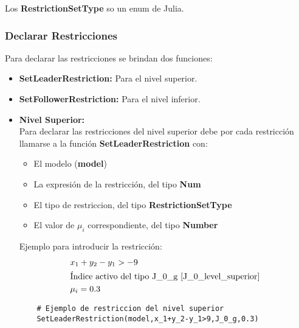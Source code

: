 Los \textbf{RestrictionSetType} so un enum de Julia.

\subsubsection{Declarar Restricciones}

Para declarar las restricciones se brindan dos funciones:
\begin{itemize}
    \item \textbf{SetLeaderRestriction:} Para el nivel superior.
    \item \textbf{SetFollowerRestriction:} Para el nivel inferior.
\end{itemize}
\begin{itemize}
    \item \textbf{Nivel Superior:}\\

Para declarar las restricciones del nivel superior debe por cada restricción
llamarse a la función \textbf{SetLeaderRestriction} con:
\begin{itemize}
    \item El modelo (\textbf{model})
    \item La expresión de la restricción, del tipo \textbf{Num}
    \item El tipo de restriccion, del tipo \textbf{RestrictionSetType}
    \item El valor de $\mu_i$ correspondiente, del tipo \textbf{Number} 
\end{itemize}

Ejemplo para introducir la restricción:
\begin{align*}
    &x_1+y_2-y_1 > -9 \\
    &\text{Índice activo del tipo J\_0\_g \refeq{J_0_level_superior}}\\
    & \mu_i=0.3
\end{align*}

\begin{lstlisting}
    # Ejemplo de restriccion del nivel superior
    SetLeaderRestriction(model,x_1+y_2-y_1>9,J_0_g,0.3)
\end{lstlisting}


\end{itemize}
